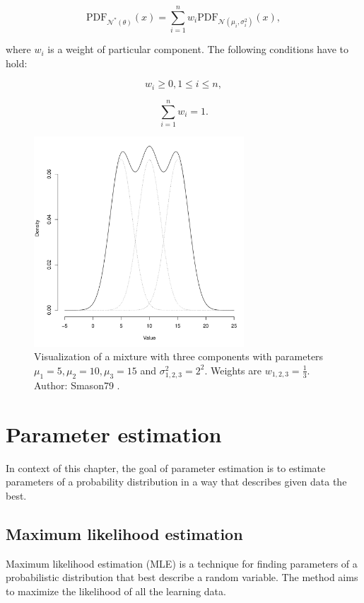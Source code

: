 \documentclass[thesis=B,english]{FITthesis}[2012/06/26]
\begin{document}
\begin{equation} \label{eq:gaussian_mixture_pdf}
\text{PDF}_{\mathcal{N}^*(\theta)}(x) = \sum_{i=1}^n w_i \text{PDF}_{\mathcal{N}(\mu_i,\sigma^2_i)}(x),
\end{equation}

where $w_i$ is a weight of particular component. The following conditions have to hold:

\begin{equation}
w_i \geq 0, 1 \leq i \leq n,
\end{equation}

\begin{equation}
\sum_{i=1}^n w_i = 1.
\end{equation}

\begin{figure}
	\centering
 	\includegraphics[width=0.7\textwidth]{gaussian_mixture}
 	\caption{Visualization of a mixture with three components with parameters $\mu_1=5, \mu_2=10, \mu_3=15$ and $\sigma_{1,2,3}^2=2^2$. Weights are $w_{1,2,3} = \frac{1}{3}$. Author: Smason79 \cite{gaussian-mixture}.}
 	\label{fig:gaussian_mixture}
\end{figure}

\chapter{Parameter estimation}
\label{parameter-estimation-chapter}
In context of this chapter, the goal of parameter estimation is to estimate parameters of a probability distribution in a way that describes given data the best.

\section{Maximum likelihood estimation}
Maximum likelihood estimation (MLE) is a technique for finding parameters of a probabilistic distribution that best describe a random variable. The method aims to maximize the likelihood of all the learning data.
\end{document}

